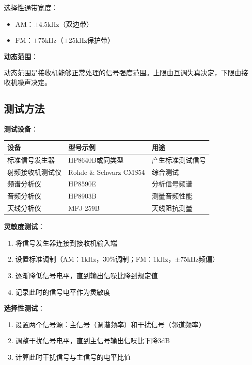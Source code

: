 选择性通带宽度：
\begin{itemize}
    \item AM：$\pm$4.5kHz（双边带）
    \item FM：$\pm$75kHz（$\pm$25kHz保护带）
\end{itemize}

\textbf{动态范围}：

动态范围是接收机能够正常处理的信号强度范围。上限由互调失真决定，下限由接收机噪声决定。

\subsection{测试方法}
\label{sec:receiver_test_methods}

\textbf{测试设备}：
\begin{center}
\begin{tabular}{|p{4cm}|p{5cm}|p{4cm}|}
\hline
\textbf{设备} & \textbf{型号示例} & \textbf{用途} \\
\hline
标准信号发生器 & HP8640B或同类型 & 产生标准测试信号 \\
射频接收机测试仪 & Rohde \& Schwarz CMS54 & 综合测试 \\
频谱分析仪 & HP8590E & 分析信号频谱 \\
音频分析仪 & HP8903B & 测量音频性能 \\
天线分析仪 & MFJ-259B & 天线阻抗测量 \\
\hline
\end{tabular}
\end{center}

\textbf{灵敏度测试}：
\begin{enumerate}
    \item 将信号发生器连接到接收机输入端
    \item 设置标准调制（AM：1kHz，30\%调制；FM：1kHz，$\pm$75kHz频偏）
    \item 逐渐降低信号电平，直到输出信噪比降到规定值
    \item 记录此时的信号电平作为灵敏度
\end{enumerate}

\textbf{选择性测试}：
\begin{enumerate}
    \item 设置两个信号源：主信号（调谐频率）和干扰信号（邻道频率）
    \item 调整干扰信号电平，直到主信号输出信噪比下降3dB
    \item 计算此时干扰信号与主信号的电平比值
\end{enumerate}

